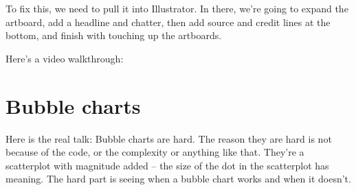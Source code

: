 \documentclass[
]{book}
\newenvironment{Shaded}{\begin{snugshade}}{\end{snugshade}}
\newcommand{\DataTypeTok}[1]{\textcolor[rgb]{0.13,0.29,0.53}{#1}}
\newcommand{\DecValTok}[1]{\textcolor[rgb]{0.00,0.00,0.81}{#1}}
\newcommand{\FloatTok}[1]{\textcolor[rgb]{0.00,0.00,0.81}{#1}}
\newcommand{\KeywordTok}[1]{\textcolor[rgb]{0.13,0.29,0.53}{\textbf{#1}}}
\newcommand{\NormalTok}[1]{#1}
\newcommand{\OperatorTok}[1]{\textcolor[rgb]{0.81,0.36,0.00}{\textbf{#1}}}
\newcommand{\StringTok}[1]{\textcolor[rgb]{0.31,0.60,0.02}{#1}}
\begin{document}
\begin{Shaded}
\end{Shaded}

To fix this, we need to pull it into Illustrator. In there, we're going to expand the artboard, add a headline and chatter, then add source and credit lines at the bottom, and finish with touching up the artboards.

Here's a video walkthrough:

\hypertarget{bubble-charts}{%
\chapter{Bubble charts}\label{bubble-charts}}

Here is the real talk: Bubble charts are hard. The reason they are hard is not because of the code, or the complexity or anything like that. They're a scatterplot with magnitude added -- the size of the dot in the scatterplot has meaning. The hard part is seeing when a bubble chart works and when it doesn't.
\end{document}
